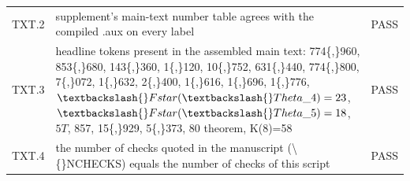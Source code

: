 \begin{longtable}{@{}l p{} l@{}}
TXT.2 & supplement's main-text number table agrees with the compiled .aux on every label & PASS\\
TXT.3 & headline tokens present in the assembled main text: 774\{,\}960, 853\{,\}680, 143\{,\}360, 1\{,\}120, 10\{,\}752, 631\{,\}440, 774\{,\}800, 7\{,\}072, 1\{,\}632, 2\{,\}400, 1\{,\}616, 1\{,\}696, 1\{,\}776, $\textbackslash\{\}Fstar(\textbackslash\{\}Theta\_4)=23$, $\textbackslash\{\}Fstar(\textbackslash\{\}Theta\_5)=18$, $5T$, 857, 15\{,\}929, 5\{,\}373, $80$ theorem, K(8)=58 & PASS\\
TXT.4 & the number of checks quoted in the manuscript (\textbackslash\{\}NCHECKS) equals the number of checks of this script & PASS\\
\end{longtable}
